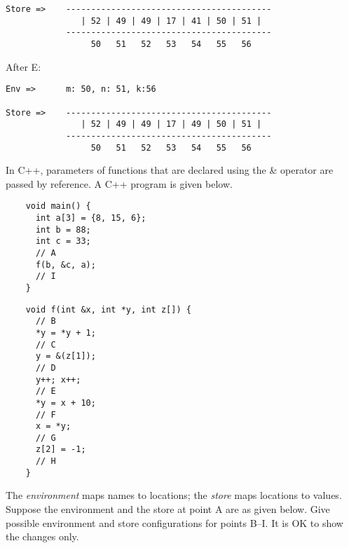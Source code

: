 \documentclass[addpoints]{exam}
\begin{document}
\begin{questions}
\begin{solution}
{\begin{verbatim}
Store =>    -----------------------------------------
               | 52 | 49 | 49 | 17 | 41 | 50 | 51 |  
            -----------------------------------------
                 50   51   52   53   54   55   56   
\end{verbatim}}

After E:
{\small
\begin{verbatim}
Env =>      m: 50, n: 51, k:56

Store =>    -----------------------------------------
               | 52 | 49 | 49 | 17 | 49 | 50 | 51 |  
            -----------------------------------------
                 50   51   52   53   54   55   56   
\end{verbatim}}
  \end{solution}

  \newpage
  \question
  In C++, parameters of functions that are declared using the \& operator are passed by reference.
  A C++ program is given below.

  {\small
    \begin{minipage}[t]{0.30\textwidth}
    \begin{verbatim}
    void main() {
      int a[3] = {8, 15, 6};
      int b = 88;
      int c = 33;
      // A
      f(b, &c, a);
      // I
    }
    \end{verbatim}
    \end{minipage}
    \begin{minipage}[t]{0.40\textwidth}
    \begin{verbatim}
    void f(int &x, int *y, int z[]) {
      // B
      *y = *y + 1;
      // C
      y = &(z[1]);
      // D
      y++; x++;
      // E
      *y = x + 10;
      // F
      x = *y;
      // G
      z[2] = -1;
      // H
    }
    \end{verbatim}
    \end{minipage}
  }

  The \emph{environment} maps names to locations;
  the \emph{store} maps locations to values. 
  Suppose the environment and the store at point A are as given below.
  Give possible environment and store configurations for points B--I.
  It is OK to show the changes only.
  

\end{questions}
\end{document}
